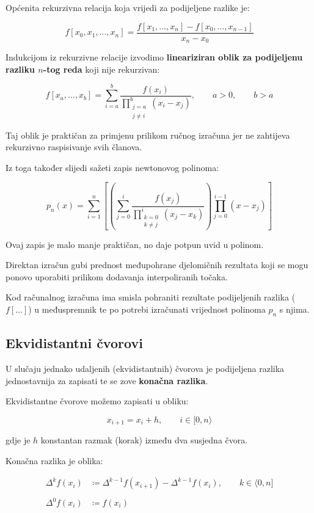 Općenita rekurzivna relacija koja vrijedi za podijeljene razlike je:

$$
f[x_0, x_1, \dots, x_n] = \frac{f[x_1, \dots, x_n]- f[x_0, \dots, x_{n-1}]}{x_n - x_0}
$$

Indukcijom iz rekurzivne relacije izvodimo \textbf{lineariziran oblik za podijeljenu razliku $n$-tog reda} koji nije rekurzivan:

$$
f[x_a, \dots, x_b] = \sum_{i=a}^{b} \frac{f(x_i)}{\prod_{\substack{j=a\\j\neq i}}^b(x_i - x_j)},\qquad a>0,\qquad b>a
$$

Taj oblik je praktičan za primjenu prilikom ručnog izračuna jer ne zahtijeva rekurzivno raspisivanje svih članova.

Iz toga također slijedi sažeti zapis newtonovog polinoma:

$$
p_n(x) = \sum_{i=1}^{n}\left[\left(\sum_{j=0}^{i} \frac{f(x_j)}{\prod_{\substack{k=0\\k\neq j}}^i(x_j - x_k)}\right)\prod_{j=0}^{i-1}(x-x_j)\right]
$$

Ovaj zapis je malo manje praktičan, no daje potpun uvid u polinom.

\begin{warningbox}[međupohrana]
    Direktan izračun gubi prednost međupohrane djelomičnih rezultata koji se mogu ponovo uporabiti prilikom dodavanja interpoliranih točaka.

    Kod računalnog izračuna ima smisla pohraniti rezultate podijeljenih razlika ($f[\dots]$) u međuspremnik te po potrebi izračunati vrijednost polinoma $p_n$ s njima.
\end{warningbox}

\newpage

\subsection{Ekvidistantni čvorovi}

U slučaju jednako udaljenih (ekvidistantnih) čvorova je podijeljena razlika jednostavnija za zapisati te se zove \textbf{konačna razlika}.

Ekvidistantne čvorove možemo zapisati u obliku:

$$
x_{i+1}=x_i+h,\qquad i\in[0,n\rangle
$$

gdje je $h$ konstantan razmak (korak) između dva susjedna čvora.

Konačna razlika je oblika:

\begin{align}
\label{kon_razl}
\Delta^kf(x_i) &\coloneq \Delta^{k-1}f(x_{i+1}) - \Delta^{k-1}f(x_i),\qquad k\in\langle0,n]\\\nonumber\\
\Delta^0f(x_i) &\coloneq f(x_i)\nonumber
\end{align}

